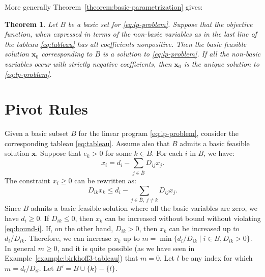 \documentclass{amsbook}
\newcommand{\xx}{\mathbf x}
\newtheorem{theorem}{Theorem}[section]
\theoremstyle{definition}
\theoremstyle{remark}
\begin{document}
More generally Theorem~\ref{theorem:basic-parametrization} gives:
\begin{theorem}
  \label{theorem:pivot-basic}
  Let $B$ be a basic set for \eqref{eq:lp-problem}.
  Suppose that the objective function, when expressed in terms of the non-basic variables as in the last line of the tableau \eqref{eq:tableau} has all coefficients nonpositive.
  Then the basic feasible solution $\xx_0$ corresponding to $B$ is a solution to \eqref{eq:lp-problem}.
  If all the non-basic variables occur with strictly negative coefficients, then $\xx_0$ is the unique solution to \eqref{eq:lp-problem}.
\end{theorem}

\section{Pivot Rules}
\label{sec:pivot-rules}

Given a basic subset $B$ for the linear program \eqref{eq:lp-problem}, consider the corresponding tableau \eqref{eq:tableau}.
Assume also that $B$ admits a basic feasible solution $\xx$.
Suppose that $e_k>0$ for some $k\in \bar B$.
For each $i$ in $B$, we have:
\begin{equation}
  \label{eq:bound-i}
  x_i = d_i - \sum_{j\in \bar B} D_{ij}x_j.
\end{equation}
The constraint $x_i\geq 0$ can be rewritten as:
\begin{displaymath}
  D_{ik}x_k \leq d_i - \sum_{j\in \bar B,\;j\neq k} D_{ij}x_j.
\end{displaymath}
Since $B$ admits a basic feasible solution where all the basic variables are zero, we have $d_i\geq 0$.
If $D_{ik}\leq 0$, then $x_k$ can be increased without bound without violating \eqref{eq:bound-i}.
If, on the other hand, $D_{ik}>0$, then $x_k$ can be increased up to $d_i/D_{ik}$.
Therefore, we can increase $x_k$ up to $m=\min\{d_i/D_{ik}\mid i\in B, D_{ik}>0\}$.
In general $m\geq 0$, and it is quite possible (as we have seen in Example~\ref{example:birkhoff3-tableau}) that $m=0$.
Let $l$ be any index for which $m=d_l/D_{il}$.
Let $B'=B\cup\{k\}-\{l\}$.
\end{document}
